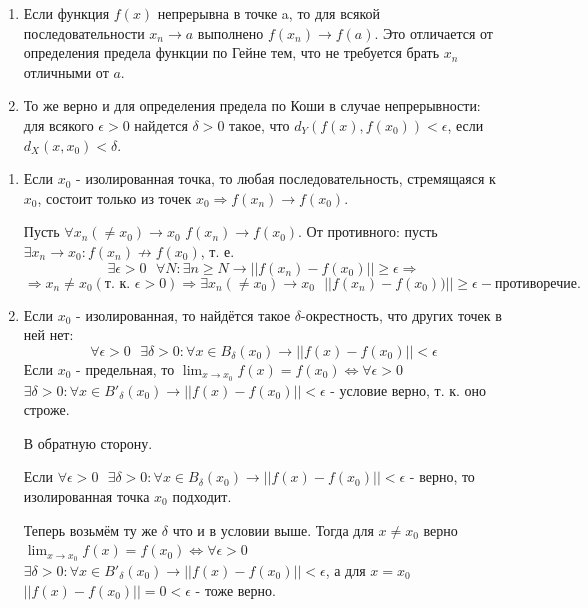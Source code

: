     \begin{mention}
    	\begin{enumerate}
	    	\item Если функция $f(x)$ непрерывна в точке a, то для всякой последовательности $x_n \rightarrow a$ выполнено $f(x_n) \rightarrow f(a)$. Это отличается от определения предела функции по Гейне тем, что не требуется брать $x_n$ отличными от $a$. 
	    	
	    	\item То же верно и для определения предела по Коши в случае непрерывности: для всякого $\epsilon > 0$ найдется $\delta > 0$ такое, что $d_Y(f(x), f(x_0)) < \epsilon$, если $d_X(x, x_0) < \delta$.
    	\end{enumerate}
    \end{mention}
    
    \begin{explanation}
    	\begin{enumerate}
    		\item Если $x_0$ - изолированная точка, то любая последовательность, стремящаяся к $x_0$, состоит только из точек $x_0 \Rightarrow f(x_n) \rightarrow f(x_0)$.
    		
    		Пусть $\forall x_n (\neq x_0) \to x_0$ $f(x_n) \to f(x_0)$. От противного: пусть $\exists x_n \to x_0 : f(x_n) \not\rightarrow f(x_0)$, т. е.
    		\[ \exists \epsilon > 0 \text{ } \forall N: \exists n \geqslant N \rightarrow ||f(x_n) - f(x_0)|| \geqslant \epsilon \Rightarrow \]
    		\[ \Rightarrow x_n \neq x_0 (\text{т. к. } \epsilon > 0) \Rightarrow \exists x_n (\neq x_0) \to x_0 \text{ } ||f(x_n) - f(x_0))|| \geqslant \epsilon - \text{противоречие.} \]
    		\item Если $x_0$ - изолированная, то найдётся такое $\delta$-окрестность, что других точек в ней нет:
    		\[ \forall \epsilon > 0 \text{ } \exists \delta > 0: \forall x \in B_{\delta}(x_0) \rightarrow ||f(x) - f(x_0)|| < \epsilon \]
    		Если $x_0$ - предельная, то $\lim_{x \to x_0} f(x) = f(x_0) \Leftrightarrow \forall \epsilon > 0$ $\exists \delta > 0: \forall x \in B'_{\delta}(x_0) \rightarrow ||f(x) - f(x_0)|| < \epsilon$ - условие верно, т. к. оно строже.
    		
    		В обратную сторону.
    		
    		Если $\forall \epsilon > 0 \text{ } \exists \delta > 0: \forall x \in B_{\delta}(x_0) \rightarrow ||f(x) - f(x_0)|| < \epsilon$ - верно, то изолированная точка $x_0$ подходит.
    		
    		Теперь возьмём ту же $\delta$ что и в условии выше. Тогда для $x \neq x_0$ верно $\lim_{x \to x_0} f(x) = f(x_0) \Leftrightarrow \forall \epsilon > 0$ $\exists \delta > 0: \forall x \in B'_{\delta}(x_0) \rightarrow ||f(x) - f(x_0)|| < \epsilon$, а для $x = x_0$ $||f(x) - f(x_0)|| = 0 < \epsilon$ - тоже верно.
    	\end{enumerate}
    \end{explanation}
    
